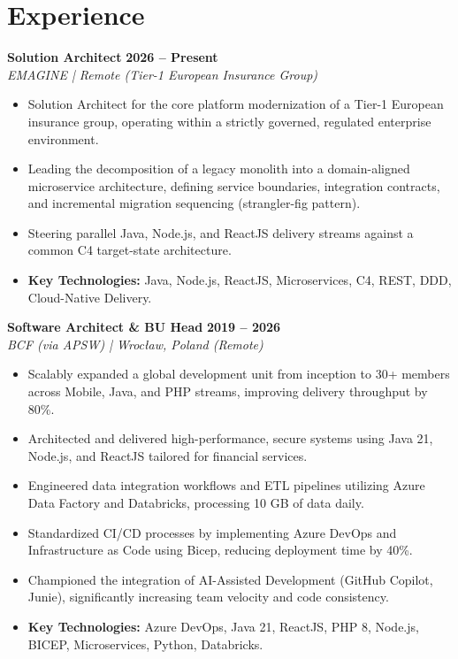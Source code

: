 \documentclass[11pt,a4paper]{article}
\begin{document}
	\section{Experience}
	
	\noindent
	\textbf{Solution Architect} \hfill \textbf{2026 -- Present} \\
	\textit{EMAGINE | Remote (Tier-1 European Insurance Group)}
	\begin{itemize}[leftmargin=*, noitemsep, topsep=4pt]
		\item Solution Architect for the core platform modernization of a Tier-1 European insurance group, operating within a strictly governed, regulated enterprise environment.
		\item Leading the decomposition of a legacy monolith into a domain-aligned microservice architecture, defining service boundaries, integration contracts, and incremental migration sequencing (strangler-fig pattern).
		\item Steering parallel Java, Node.js, and ReactJS delivery streams against a common C4 target-state architecture.
		\item \textbf{Key Technologies:} Java, Node.js, ReactJS, Microservices, C4, REST, DDD, Cloud-Native Delivery.
	\end{itemize}

	\vspace{8pt}
	\noindent
	\textbf{Software Architect \& BU Head} \hfill \textbf{2019 -- 2026} \\
	\textit{BCF (via APSW) | Wrocław, Poland (Remote)}
	\begin{itemize}[leftmargin=*, noitemsep, topsep=4pt]
		\item Scalably expanded a global development unit from inception to 30+ members across Mobile, Java, and PHP streams, improving delivery throughput by 80\%.
		\item Architected and delivered high-performance, secure systems using Java 21, Node.js, and ReactJS tailored for financial services.
		\item Engineered data integration workflows and ETL pipelines utilizing Azure Data Factory and Databricks, processing 10 GB of data daily.
		\item Standardized CI/CD processes by implementing Azure DevOps and Infrastructure as Code using Bicep, reducing deployment time by 40\%.
		\item Championed the integration of AI-Assisted Development (GitHub Copilot, Junie), significantly increasing team velocity and code consistency.
		\item \textbf{Key Technologies:} Azure DevOps, Java 21, ReactJS, PHP 8, Node.js, BICEP, Microservices, Python, Databricks.
	\end{itemize}
	
\end{document}
